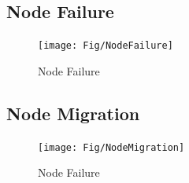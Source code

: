 \subsection{Node Failure}
\begin{figure}[htbp]
  \centering
  \texttt{[image: Fig/NodeFailure]}\\
  \caption{Node Failure}\label{fig:NodeFailure}
\end{figure}


\subsection{Node Migration}
\begin{figure}[htbp]
  \centering
  \texttt{[image: Fig/NodeMigration]}\\
  \caption{Node Failure}\label{fig:NodeMigration}
\end{figure}





